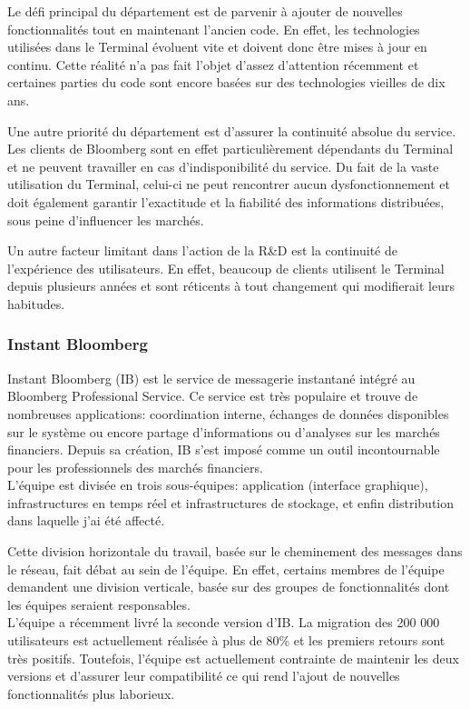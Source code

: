 \documentclass[11pt, oneside, titlepage, a4paper]{article}
\begin{document}
Le défi principal du département est de parvenir à ajouter de nouvelles fonctionnalités tout en maintenant l'ancien code. En effet, les technologies utilisées dans le Terminal évoluent vite et doivent donc être mises à jour en continu. Cette réalité n'a pas fait l'objet d'assez d'attention récemment et certaines parties du code sont encore basées sur des technologies vieilles de dix ans.

Une autre priorité du département est d'assurer la continuité absolue du service. Les clients de Bloomberg sont en effet particulièrement dépendants du Terminal et ne peuvent travailler en cas d'indisponibilité du service. Du fait de la vaste utilisation du Terminal, celui-ci ne peut rencontrer aucun dysfonctionnement et doit également garantir l'exactitude et la fiabilité des informations distribuées, sous peine d'influencer les marchés.

Un autre facteur limitant dans l'action de la R\&D est la continuité de l'expérience des utilisateurs. En effet, beaucoup de clients utilisent le Terminal depuis plusieurs années et sont réticents à tout changement qui modifierait leurs habitudes.
		\subsubsection{Instant Bloomberg}
Instant Bloomberg (IB) est le service de messagerie instantané intégré au Bloomberg Professional Service. Ce service est très populaire et trouve de nombreuses applications: coordination interne, échanges de données disponibles sur le système ou encore partage d'informations ou d'analyses sur les marchés financiers. Depuis sa création, IB s'est imposé comme un outil incontournable pour les professionnels des marchés financiers.
\\

L'équipe est divisée en trois sous-équipes: application (interface graphique), infrastructures en temps réel et infrastructures de stockage, et enfin distribution dans laquelle j'ai été affecté.

Cette division horizontale du travail, basée sur le cheminement des messages dans le réseau, fait débat au sein de l'équipe. En effet, certains membres de l'équipe demandent une division verticale, basée sur des groupes de fonctionnalités dont les équipes seraient responsables.
\\

L'équipe a récemment livré la seconde version d'IB. La migration des 200 000 utilisateurs est actuellement réalisée à plus de 80\% et les premiers retours sont très positifs. Toutefois, l'équipe est actuellement contrainte de maintenir les deux versions et d'assurer leur compatibilité ce qui rend l'ajout de nouvelles fonctionnalités plus laborieux.
\end{document}
